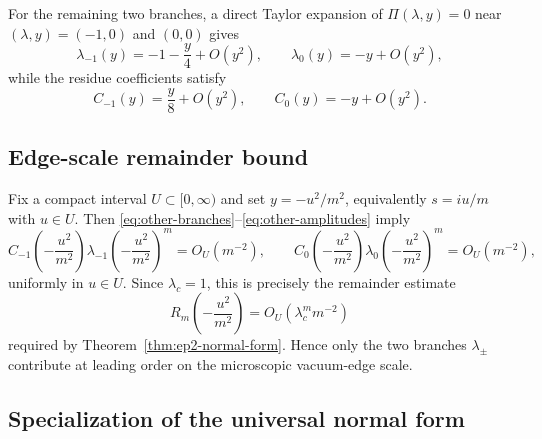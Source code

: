 For the remaining two branches, a direct Taylor expansion of $\Pi(\lambda,y)=0$ near $(\lambda,y)=(-1,0)$ and $(0,0)$ gives
\begin{equation}\label{eq:other-branches}
\lambda_{-1}(y)=-1-\frac{y}{4}+O(y^2),
\qquad
\lambda_0(y)=-y+O(y^2),
\end{equation}
while the residue coefficients satisfy
\begin{equation}\label{eq:other-amplitudes}
C_{-1}(y)=\frac{y}{8}+O(y^2),
\qquad
C_0(y)=-y+O(y^2).
\end{equation}

\subsection{Edge-scale remainder bound}

Fix a compact interval $U\subset[0,\infty)$ and set $y=-u^2/m^2$, equivalently $s=iu/m$ with $u\in U$.
Then \eqref{eq:other-branches}--\eqref{eq:other-amplitudes} imply
\[
C_{-1}\!\left(-\frac{u^2}{m^2}\right)\lambda_{-1}\!\left(-\frac{u^2}{m^2}\right)^m
=O_U(m^{-2}),
\qquad
C_0\!\left(-\frac{u^2}{m^2}\right)\lambda_0\!\left(-\frac{u^2}{m^2}\right)^m
=O_U(m^{-2}),
\]
uniformly in $u\in U$.
Since $\lambda_c=1$, this is precisely the remainder estimate
\[
R_m\!\left(-\frac{u^2}{m^2}\right)=O_U(\lambda_c^m m^{-2})
\]
required by Theorem~\ref{thm:ep2-normal-form}.
Hence only the two branches $\lambda_\pm$ contribute at leading order on the microscopic vacuum-edge scale.

\subsection{Specialization of the universal normal form}

